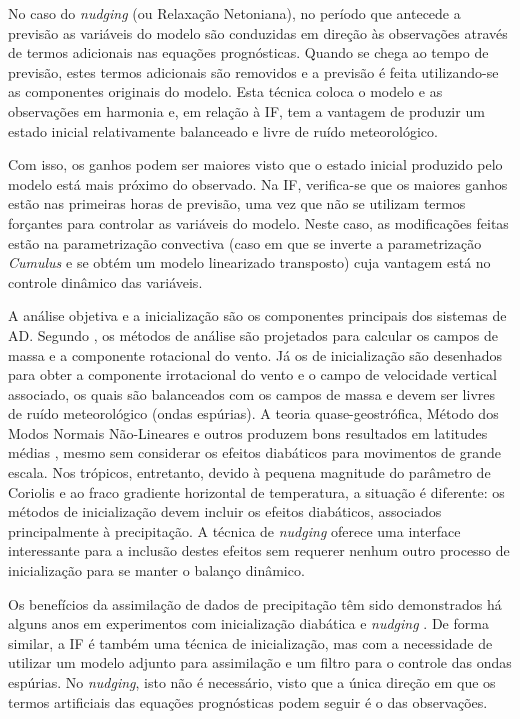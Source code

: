 No caso do \textit{nudging} (ou Relaxação Netoniana), no período que antecede a previsão as variáveis do modelo são conduzidas em direção às observações através de termos adicionais nas equações prognósticas. Quando se chega ao tempo de previsão, estes termos adicionais são removidos e a previsão é feita utilizando-se as componentes originais do modelo. Esta técnica coloca o modelo e as observações em harmonia e, em relação à IF, tem a vantagem de produzir um estado inicial relativamente balanceado e livre de ruído meteorológico. 

Com isso, os ganhos podem ser maiores visto que o estado inicial produzido pelo modelo está mais próximo do observado. Na IF, verifica-se que os maiores ganhos estão nas primeiras horas de previsão, uma vez que não se utilizam termos forçantes para controlar as variáveis do modelo. Neste caso, as modificações feitas estão na parametrização convectiva (caso em que se inverte a parametrização \textit{Cumulus} e se obtém um modelo linearizado transposto) cuja vantagem está no controle dinâmico das variáveis.

A análise objetiva e a inicialização são os componentes principais dos sistemas de AD. Segundo , os métodos de análise são projetados para calcular os campos de massa e a componente rotacional do vento. Já os de inicialização são desenhados para obter a componente irrotacional do vento e o campo de velocidade vertical associado, os quais são balanceados com os campos de massa e devem ser livres de ruído meteorológico (ondas espúrias). A teoria quase-geostrófica, Método dos Modos Normais Não-Lineares e outros produzem bons resultados em latitudes médias \cite{krishnamurtietal91}, mesmo sem considerar os efeitos diabáticos para movimentos de grande escala. Nos trópicos, entretanto, devido à pequena magnitude do parâmetro de Coriolis e ao fraco gradiente horizontal de temperatura, a situação é diferente: os métodos de inicialização devem incluir os efeitos diabáticos, associados principalmente à precipitação. A técnica de \textit{nudging} oferece uma interface interessante para a inclusão destes efeitos sem requerer nenhum outro processo de inicialização para se manter o balanço dinâmico.

Os benefícios da assimilação de dados de precipitação têm sido demonstrados há alguns anos em experimentos com inicialização diabática e \textit{nudging} \cite{zupanskimesinger95}. De forma similar, a IF é também uma técnica de inicialização, mas com a necessidade de utilizar um modelo adjunto para assimilação e um filtro para o controle das ondas espúrias. No \textit{nudging}, isto não é necessário, visto que a única direção em que os termos artificiais das equações prognósticas podem seguir é o das observações.

